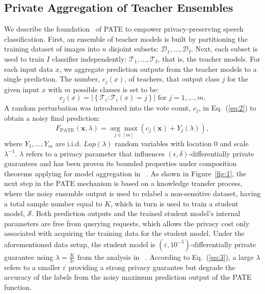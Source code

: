 \documentclass[a4paper]{article}
\begin{document}
\subsection{Private Aggregation of Teacher Ensembles}

We describe the foundation~\cite{papernot2016semi, papernot2018scalable} of PATE to empower privacy-preserving speech classification. First, an ensemble of teacher models is built by partitioning the training dataset of images into $n$ disjoint subsets: $\mathcal{D}_1 ,..., \mathcal{D}_I$. Next, each subset is used to train $I$ classifier independently: $\mathcal{T}_1,..., \mathcal{T}_I$, that is, the teacher models. For each input data $x$, we aggregate prediction outputs from the teacher models to a single prediction.
The number, $c_{j}(x)$, of teachers, that output class $j$ for the given input $x$ with $m$ possible classes is set to be:
\begin{equation}
c_{j}(x)=\left|\left\{\mathcal{T}_{i}: \mathcal{T}_{i}(x)=j\right\}\right| \text { for } j=1, \ldots, m.
\label{eq:2}
\end{equation}
A random perturbation was introduced into the vote count, $c_j$, in Eq.~(\ref{eq:2}) to obtain a noisy final prediction:
\begin{equation}
F_{\operatorname{PATE}}(\mathbf{x},{\lambda})=\underset{j \in[m]}{\arg \max }\left(c_{j}(\mathbf{x})+Y_{j}({\lambda})\right),
\label{eq:3}
\end{equation}
where $Y_{1}, ..., Y_{m}$ are i.i.d. $Lap(\lambda)$ random variables with location $0$ and scale $\lambda^{-1}$. $\lambda$ refers to a privacy parameter that influences $(\epsilon, \delta)$-differentially private guarantees and has been proven its bounded properties under composition theorems applying for model aggregation in ~\cite{papernot2016semi, papernot2018scalable}. As shown in Figure~\ref{fig:1}, the next step in the PATE mechanism is based on a knowledge transfer process, where the noisy ensemble output is used to relabel a non-sensitive dataset, having a total sample number equal to $K$, which in turn is used to train a student model, $\mathcal{S}$. Both prediction outputs and the trained student model's internal parameters are free from querying requests, which allows the privacy cost only associated with acquiring the training data for the student model. Under the aforementioned data setup, the  student model is $(\varepsilon, 10^{-5})$-differentially private guarantee using $\lambda=\frac{K}{2\varepsilon}$ from the analysis in ~\cite{papernot2016semi, papernot2018scalable}. According to Eq.~(\ref{eq:3}), a large $\lambda$ refers to a smaller $\varepsilon$ providing a strong privacy guarantee but degrade the accuracy of the labels from the noisy maximum prediction output of the PATE function.
\end{document}
